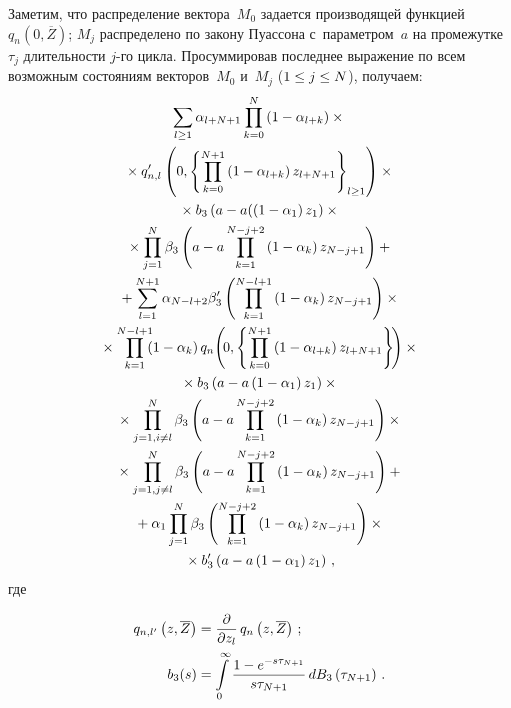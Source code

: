 \begin{multicols}{2}
  Заметим, что распределение вектора~$M_0$ задается производящей 
функцией $q_n(0,\overline{Z})$; $M_j$ распределено по закону Пуассона 
с~параметром~$a$ на промежутке~$\tau_j$ длительности $j$-го цикла. 
Просуммировав последнее выражение по всем возможным состояниям 
векторов~$M_0$ и~$M_j$ ($1\hm\leq j\hm\leq N$), получаем:
  \begin{multline*}
  \sum\limits_{l\geq1} \alpha_{l+N+1} \prod\limits^N_{k=0} \left( 1-
\alpha_{l+k}\right)\times{}\\
{}\times q^\prime_{n,l}\left( 0, 
\left\{ \prod\limits_{k=0}^{N+1} \left( 1-
\alpha_{l+k}\right) z_{l+N+1}\right\}_{l\geq1}\right)\times{}\\
{}\times b_3\left( a-a(\left( 1-
\alpha_1\right)z_1\right)\times{}\\
  {}\times
  \prod\limits^N_{j=1} \beta_3\left( a- a\prod\limits_{k=1}^{N-j+2}\left( 1-
\alpha_k\right) z_{N-j+1}\right) +{}\\
{}+\sum\limits_{l=1}^{N+1} \alpha_{N-l+2} 
\beta_{3}^\prime \left( \prod\limits_{k=1}^{N-l+1} \left( 1-\alpha_k\right) z_{N-
j+1}\right)\times{}\\
  {}\times
\prod\limits_{k=1}^{N-l+1}\hspace*{-2mm}
\left( 1-\alpha_k\right) q_n\!\left(\! 0,\left\{ 
\prod\limits_{k=0}^{N+1} \left( 1-\alpha_{l+k}\right) z_{l+N+1}\right\}\!\right) \times{}\\
{}\times
b_3\left( a-a\left( 1-\alpha_1\right)z_1\right) \times{}\\
{}\times
\prod\limits^N_{j=1,i\not=l} \beta_3 \left(a-a\prod\limits_{k=1}^{N-j+2} \left(1-
\alpha_k\right)z_{N-j+1}\right)\times{}\\
{}\times \prod\limits^N_{j=1,j\not=l} \beta_3 \left(
a-a\prod\limits_{k=1}^{N-j+2} \left(1-\alpha_k\right) z_{N-j+1}\right)+{}\\
{}+\alpha_1\prod\limits^N_{j=1} \beta_3\left( \prod\limits_{k=1}^{N-j+2} \left(
1-\alpha_k\right) z_{N-j+1}\right) \times{}\\
{}\times b_3^\prime \left(a-a\left(1-\alpha_1\right)z_1\right)\,,
\end{multline*}
где 

\noindent
\begin{align*}
q_{n,l^\prime} \left(z,\overline{Z}\right)&= \displaystyle\frac{\displaystyle \partial\mathstrut}{\displaystyle \partial z_l\mathstrut}\,
q_n\left(z,\overline{Z}\right)\,;
\\
b_3(s)&= \int\limits_0^\infty \displaystyle\frac{\displaystyle 1-e^{-s\tau_{N+1}}\mathstrut}{\displaystyle s\tau_{N+1}\mathstrut}\,dB_3 
\left(\tau_{N+1}\right)\,.
\end{align*}
  

\end{multicols}
